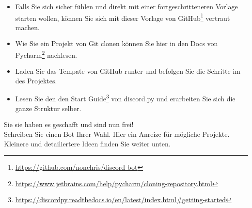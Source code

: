 \documentclass{ubo_tex_uebungszettel/uebungszettel}
\theoremstyle{definition}
\newcommand{\pp}[1]{\lpl{#1}}
\newcommand{\furl}[1]{\footnote{\url{#1}}}
\begin{document}
\begin{aufg}
		\begin{itemize}
			\item Falls Sie sich sicher fühlen und direkt mit einer fortgeschritteneren Vorlage starten wollen, können Sie sich mit dieser Vorlage von GitHub\furl{https://github.com/nonchris/discord-bot} vertraut machen.
			\item Wie Sie ein Projekt von Git clonen können Sie hier in den Docs von Pycharm\furl{https://www.jetbrains.com/help/pycharm/cloning-repository.html} nachlesen.\\
			\item Laden Sie das Tempate von GitHub runter und befolgen Sie die Schritte im \pp{README} des Projektes.
		\end{itemize}

        \noindent{} \quad
		
		\begin{itemize}
			\item Lesen Sie den den Start Guide\furl{https://discordpy.readthedocs.io/en/latest/index.html\#getting-started} von discord.py und erarbeiten Sie sich die ganze Struktur selber.
		\end{itemize}
	\end{aufg}
	
	\pagebreak
	
	\noindent {} \quad
	
	\noindent Sie sie haben es geschafft und sind nun frei!\\
	Schreiben Sie einen Bot Ihrer Wahl. Hier ein Anreize für mögliche Projekte. Kleinere und detailiertere Ideen finden Sie weiter unten.
	
\end{document}
